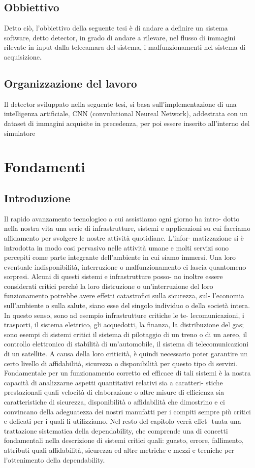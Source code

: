 \documentclass[14pt]{extarticle}
\begin{document}
\subsection{Obbiettivo}
Detto ciò, l'obbiettivo della seguente tesi è di andare a definire un sistema software, detto detector, in grado di andare a rilevare, nel flusso di immagini rilevate in input dalla telecamara del sistema, i malfunzionamenti nel sistema di acquisizione. 
\subsection{Organizzazione del lavoro} 
Il detector sviluppato nella seguente tesi, si basa sull'implementazione di una intelligenza artificiale, CNN (convulutional Neureal Network), addestrata con un dataset di immagini acquisite in  precedenza, per poi essere inserito all'interno del simulatore
\section{Fondamenti}
\subsection{Introduzione}
Il rapido avanzamento tecnologico a cui assistiamo ogni giorno ha intro-
dotto nella nostra vita una serie di infrastrutture, sistemi e applicazioni su
cui facciamo affidamento per svolgere le nostre attività quotidiane. L’infor-
matizzazione si è introdotta in modo cosi pervasivo nelle attività umane e
molti servizi sono percepiti come parte integrante dell’ambiente in cui siamo
immersi. Una loro eventuale indisponibilità, interruzione o malfunzionamento
ci lascia quantomeno sorpresi. Alcuni di questi sistemi e infrastrutture posso-
no inoltre essere considerati critici perché la loro distruzione o un’interruzione
del loro funzionamento potrebbe avere effetti catastrofici sulla sicurezza, sul-
l’economia sull’ambiente o sulla salute, siano esse del singolo individuo o della
società intera. In questo senso, sono ad esempio infrastrutture critiche le te-
lecomunicazioni, i trasporti, il sistema elettrico, gli acquedotti, la finanza, la
distribuzione del gas; sono esempi di sistemi critici il sistema di pilotaggio di
un treno o di un aereo, il controllo elettronico di stabilità di un’automobile,
il sistema di telecomunicazioni di un satellite. A causa della loro criticità, è
quindi necessario poter garantire un certo livello di affidabilità, sicurezza o
disponibilità per questo tipo di servizi.
Fondamentale per un funzionamento corretto ed efficace di tali sistemi è
la nostra capacità di analizzarne aspetti quantitativi relativi sia a caratteri-
stiche prestazionali quali velocità di elaborazione o altre misure di efficienza
sia caratteristiche di sicurezza, disponibilità o affidabilità che dimostrino e ci
convincano della adeguatezza dei nostri manufatti per i compiti sempre più
critici e delicati per i quali li utilizziamo. Nel resto del capitolo verrà effet-
tuata una trattazione sistematica della dependability, che comprende una di
concetti fondamentali nella descrizione di sistemi critici quali: guasto, errore,
fallimento, attributi quali affidabilità, sicurezza ed altre metriche e mezzi e
tecniche per l’ottenimento della dependability.
\end{document}
